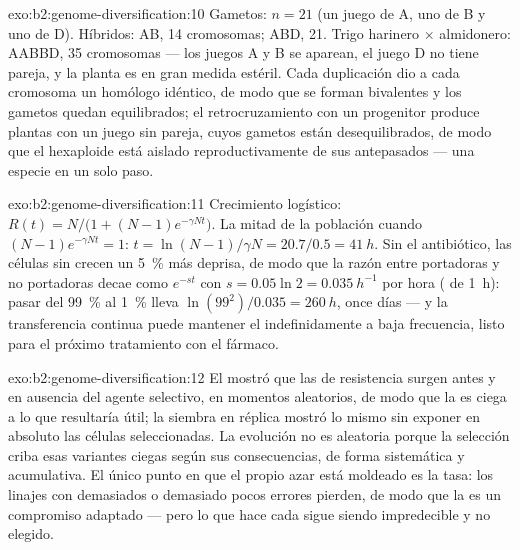 \begin{solution}{exo:b2:genome-diversification:10}
Gametos: $n = 21$ (un juego de A, uno de B y uno de D). Híbridos: AB, 14
cromosomas; ABD, 21. Trigo harinero $\times$ almidonero: AABBD, 35
cromosomas --- los juegos A y B se aparean, el juego D no tiene pareja, y
la planta es en gran medida estéril. Cada duplicación dio a cada
cromosoma un homólogo idéntico, de modo que se forman bivalentes y los
gametos quedan equilibrados; el retrocruzamiento con un progenitor produce
plantas con un juego sin pareja, cuyos gametos están desequilibrados, de
modo que el hexaploide está aislado reproductivamente de sus antepasados
--- una especie en un solo paso.
\end{solution}

\begin{solution}{exo:b2:genome-diversification:11}
Crecimiento logístico: $R(t) = N/\bigl(1 + (N - 1)e^{-\gamma Nt}\bigr)$.
La mitad de la población cuando $(N - 1)e^{-\gamma Nt} = 1$: $t = \ln(N -
1)/\gamma N = 20.7/0.5 = \qty{41}{h}$. Sin el antibiótico, las células
sin  crecen un \qty{5}{\%} más deprisa, de modo que la razón entre
portadoras y no portadoras decae como $e^{-st}$ con $s = 0.05\ln 2 =
\qty{0.035}{h^{-1}}$ por hora ( de \qty{1}{h}): pasar
del \qty{99}{\%} al \qty{1}{\%} lleva $\ln(99^2)/0.035 = \qty{260}{h}$,
once días --- y la transferencia continua puede mantener el 
indefinidamente a baja frecuencia, listo para el próximo tratamiento con
el fármaco.
\end{solution}

\begin{solution}{exo:b2:genome-diversification:12}
El  mostró que las  de resistencia surgen
antes y en ausencia del agente selectivo, en momentos aleatorios, de modo
que la  es ciega a lo que resultaría útil; la siembra en réplica
mostró lo mismo sin exponer en absoluto las células seleccionadas. La
evolución no es aleatoria porque la selección criba esas variantes ciegas
según sus consecuencias, de forma sistemática y acumulativa. El único
punto en que el propio azar está moldeado es la tasa: los linajes con
demasiados o demasiado pocos errores pierden, de modo que la  es un compromiso adaptado --- pero lo que hace cada 
sigue siendo impredecible y no elegido.
\end{solution}

